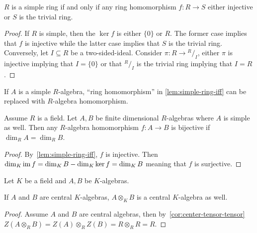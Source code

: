 \begin{lemma}\label{lem:simple-ring-iff}
  $R$ is a simple ring if and only if any ring homomorphism $f : R \to S$ either
  injective or $S$ is the trivial ring. \leanok
\end{lemma}
\begin{proof}
  If $R$ is simple, then the $\ker f$ is either $\{0\}$ or $R$. The former case
  implies that $f$ is injective while the latter case implies that $S$ is the
  trivial ring. Conversely, let $I\subseteq R$ be a two-sided-ideal. Consider
  $\pi: R \to {}^{R}/_{I}$, either $\pi$ is injective implying that $I = \{0\}$
  or that ${}^{R}/_{I}$ is the trivial ring implying that $I = R$.
\end{proof}
\begin{remark}
  If $A$ is a simple $R$-algebra, ``ring homomorphism'' in \cref{lem:simple-ring-iff} can be replaced with $R$-algebra homomorphism.
\end{remark}

\begin{corollary}\label{cor:alghom-bijective-of-dim-eq}
  Assume $R$ is a field. Let $A, B$ be finite dimensional $R$-algebras where $A$
  is simple as well. Then any $R$-algebra homomorphism $f:A\to B$ is bijective
  if $\dim_{R}A=\dim_{R}B$. \leanok
\end{corollary}
\begin{proof}
  By~\cref{lem:simple-ring-iff}, $f$ is injective. Then
  $\dim_{K}\operatorname{im} f = \dim_{K} B - \dim_{K}\ker f = \dim_{K}B$ meaning that $f$ is
  surjective.
\end{proof}

Let $K$ be a field and $A, B$ be $K$-algebras.
\begin{lemma}
  \label{lem:tensor-central}
  If $A$ and $B$ are central $K$-algebras, $A\otimes_{K}B$ is a central
  $K$-algebra as well.
  \leanok
\end{lemma}
\begin{proof}
  Assume $A$ and $B$ are central algebras, then
  by~\cref{cor:center-tensor-tensor}
  $Z\left(A\otimes_{R}B\right)=Z\left(A\right)\otimes_{R}Z\left(B\right)=R\otimes_{R}R=R$.
\end{proof}

